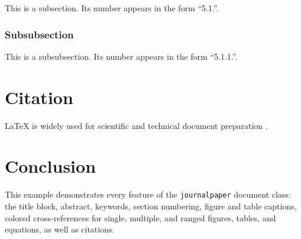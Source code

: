 \documentclass[11pt]{../class/journalpaper}
\begin{document}
This is a subsection. Its number appears in the form
``5.1.''.

\subsubsection{Subsubsection}

This is a subsubsection. Its number appears in the form
``5.1.1.''.



\section{Citation}

\LaTeX{} is widely used for scientific and technical document
preparation \citep{lamport1994}.



\section{Conclusion}

This example demonstrates every feature of the
\texttt{journalpaper} document class: the title block,
abstract, keywords, section numbering, figure and table
captions, colored cross-references for single, multiple, and
ranged figures, tables, and equations, as well as citations.





\end{document}
